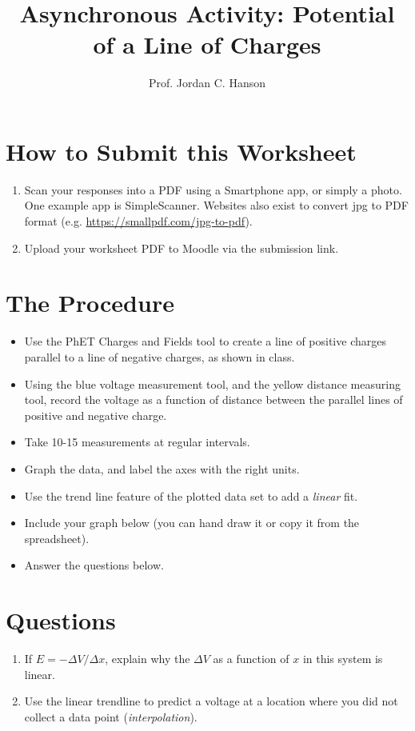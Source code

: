 \documentclass{article}
\begin{document}
\title{Asynchronous Activity: Potential of a Line of Charges}
\author{Prof. Jordan C. Hanson}

\maketitle

\section{How to Submit this Worksheet}

\begin{enumerate}
\item Scan your responses into a PDF using a Smartphone app, or simply a photo.  One example app is SimpleScanner.  Websites also exist to convert jpg to PDF format (e.g. \url{https://smallpdf.com/jpg-to-pdf}).
\item Upload your worksheet PDF to Moodle via the submission link.
\end{enumerate}

\section{The Procedure}

\begin{itemize}
\item Use the PhET Charges and Fields tool to create a line of positive charges parallel to a line of negative charges, as shown in class.
\item Using the blue voltage measurement tool, and the yellow distance measuring tool, record the voltage as a function of distance between the parallel lines of positive and negative charge.
\item Take 10-15 measurements at regular intervals.
\item Graph the data, and label the axes with the right units.
\item Use the trend line feature of the plotted data set to add a \textit{linear} fit.
\item Include your graph below (you can hand draw it or copy it from the spreadsheet).
\item Answer the questions below.
\end{itemize}

\section{Questions}

\begin{enumerate}
\item If $E = - \Delta V / \Delta x$, explain why the $\Delta V$ as a function of $x$ in this system is linear.
\item Use the linear trendline to predict a voltage at a location where you did not collect a data point (\textit{interpolation}).
\end{enumerate}

\vspace{10cm}
\end{document}
